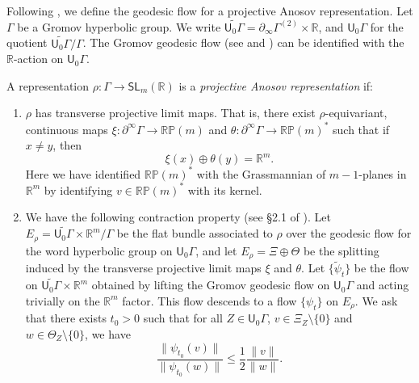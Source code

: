 Following \cite{bcls}, we define the geodesic flow for a projective Anosov representation. Let $\Gamma$ be a Gromov hyperbolic group. We write $\widetilde{\mathsf{U}_0\Gamma} = \partial_\infty \Gamma^{(2)} \times \mathbb R$, and $\mathsf{U}_0\Gamma$ for the quotient $\widetilde{\mathsf{U}_0\Gamma}/\Gamma$. The Gromov geodesic flow (see \cite{champetier} and \cite{mineyev}) can be identified with the $\mathbb R$-action on $\mathsf{U}_0\Gamma$.
\begin{defn}
A representation $\rho:\Gamma\to\mathsf{SL}_m(\mathbb{R})$ is a \emph{projective Anosov representation} if:
\begin{enumerate}
\item $\rho$ has transverse projective limit maps. That is, there exist $\rho$-equivariant, continuous maps $\xi:\partial^\infty\Gamma \to \mathbb{RP}(m)$ and $\theta:\partial^\infty\Gamma \to \mathbb{RP}(m)^*$ such that if $x\neq y$, then
\[ \xi(x) \oplus \theta(y) = \mathbb{R}^m.\]
Here we have identified $\mathbb{RP}(m)^*$ with the Grassmannian of $m-1$-planes in $\mathbb{R}^m$ by identifying $v\in\mathbb{RP}(m)^*$ with its kernel.

\item We have the following contraction property (see \S2.1 of \cite{bcls}). Let $E_\rho = \widetilde{\mathsf{U}_0\Gamma} \times \mathbb R^{m}/ \Gamma$ be the flat bundle associated to $\rho$ over the geodesic flow for the word hyperbolic group on $\mathsf{U}_0\Gamma$, and let $E_\rho = \Xi \oplus \Theta$ be the splitting induced by the transverse projective limit maps $\xi$ and $\theta$. Let $\{\tilde \psi_t\}$ be the flow on $\widetilde{\mathsf{U}_0\Gamma} \times \mathbb R^{m}$ obtained by lifting the Gromov geodesic flow on $\mathsf{U}_0\Gamma$ and acting trivially on the $\mathbb R^m$ factor. This flow descends to a flow $\{\psi_t\}$ on $E_\rho$. We ask that there exists $t_0>0$ such that for all $Z\in \mathsf{U}_0\Gamma$, $v \in \Xi_Z\setminus\{0\}$ and $w \in \Theta_Z \setminus \{ 0\}$, we have
\[ \frac{\| \psi_{t_0} (v) \|}{\| \psi_{t_0} (w) \|} \leq \frac{1}{2} \frac{ \| v \|}{\| w \|}. \] 
\end{enumerate}
\end{defn}

